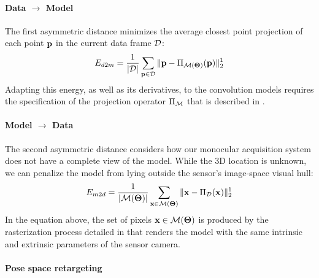 \paragraph{Data $\rightarrow$ Model}
The first asymmetric distance minimizes the average closest point projection of each point $\mathbf{p}$ in the current data frame $\mathcal{D}$:
%
\begin{equation}
E_{d2m} = \frac{1}{|\mathcal{D}|}\sum_{\mathbf{p} \in \mathcal{D}} \| \mathbf{p} - \Pi_{\mathcal{M}(\boldsymbol{\Theta})}(\mathbf{p})\|_2^1
\label{eq:d2m}
\end{equation}
% 
Adapting this energy, as well as its derivatives, to the convolution models requires the specification of the projection operator $\Pi_{\mathcal{M}}$ that is described in .

\paragraph{Model $\rightarrow$ Data}
The second asymmetric distance considers how our monocular acquisition system does not have a complete view of the model. While the 3D location is unknown, we can penalize the model from lying outside the sensor's image-space visual hull:
\begin{equation}
E_{m2d} = \frac{1}{|\mathcal{M}(\boldsymbol{\Theta})|} \sum_{\mathbf{x} \in \mathcal{M}(\boldsymbol{\Theta})} \| \mathbf{x} - \Pi_{\mathcal{D}}(\mathbf{x})\|_2^1
\label{eq:m2d}
\end{equation}
In the equation above, the set of pixels $\mathbf{x} \in \mathcal{M}(\boldsymbol{\Theta})$ is produced by the rasterization process detailed in  that renders the model with the same intrinsic and extrinsic parameters of the sensor camera. 

\paragraph{Pose space retargeting}
